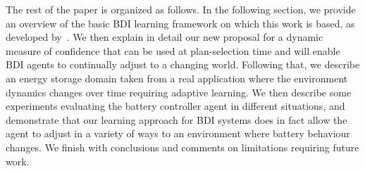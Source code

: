 The rest of the paper is organized as follows.
In the following section, we provide an overview of the basic BDI learning framework on which this work is based, as developed by~\cite{airiau09:enhancing,singh10:extending,singh10:learning}. 
We then explain in detail our new proposal for a dynamic measure of confidence that can be used at plan-selection time and will enable BDI agents to continually adjust to a changing world. 
Following that, we describe an energy storage domain taken from a real application where the environment dynamics changes over time requiring adaptive learning. We then describe some experiments evaluating the battery controller agent in different situations, and demonstrate that our learning approach for BDI systems does in fact allow the agent to adjust in a variety of ways to an environment where battery behaviour changes. 
We finish with conclusions and comments on limitations requiring future work.
